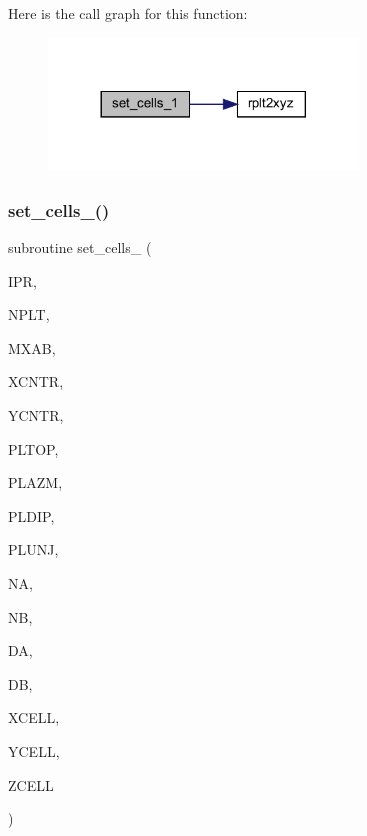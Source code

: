 Here is the call graph for this function\+:\nopagebreak
\begin{figure}[H]
\begin{center}
\leavevmode
\includegraphics[width=233pt]{Leroi__c_8f90_a34542cb94b24b37bf99b63f2e3e5e368_cgraph}
\end{center}
\end{figure}
\mbox{\label{Leroi__c_8f90_a14cc0157cbf2d5d8c0af6167028061cf}} 
\subsubsection{\texorpdfstring{set\+\_\+cells\+\_()}{set\_cells\_2()}}
{\footnotesize\ttfamily subroutine set\+\_\+cells\+\_ (\begin{DoxyParamCaption}\item[{integer}]{I\+PR,  }\item[{integer}]{N\+P\+LT,  }\item[{integer}]{M\+X\+AB,  }\item[{real, dimension(nplt)}]{X\+C\+N\+TR,  }\item[{real, dimension(nplt)}]{Y\+C\+N\+TR,  }\item[{real, dimension(nplt)}]{P\+L\+T\+OP,  }\item[{real, dimension(nplt)}]{P\+L\+A\+ZM,  }\item[{real, dimension(nplt)}]{P\+L\+D\+IP,  }\item[{real, dimension(nplt)}]{P\+L\+U\+NJ,  }\item[{integer, dimension(nplt)}]{NA,  }\item[{integer, dimension(nplt)}]{NB,  }\item[{real, dimension(nplt)}]{DA,  }\item[{real, dimension(nplt)}]{DB,  }\item[{real, dimension(mxab,nplt)}]{X\+C\+E\+LL,  }\item[{real, dimension(mxab,nplt)}]{Y\+C\+E\+LL,  }\item[{real, dimension(mxab,nplt)}]{Z\+C\+E\+LL }\end{DoxyParamCaption})}

